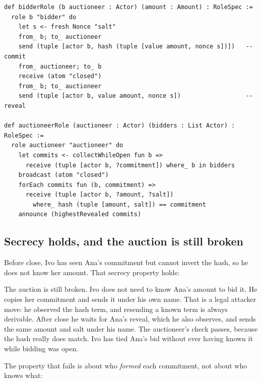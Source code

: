 \begin{lstlisting}
def bidderRole (b auctioneer : Actor) (amount : Amount) : RoleSpec :=
  role b "bidder" do
    let s <- fresh Nonce "salt"
    from_ b; to_ auctioneer
    send (tuple [actor b, hash (tuple [value amount, nonce s])])   -- commit
    from_ auctioneer; to_ b
    receive (atom "closed")
    from_ b; to_ auctioneer
    send (tuple [actor b, value amount, nonce s])                  -- reveal

def auctioneerRole (auctioneer : Actor) (bidders : List Actor) : RoleSpec :=
  role auctioneer "auctioneer" do
    let commits <- collectWhileOpen fun b =>
      receive (tuple [actor b, ?commitment]) where_ b in bidders
    broadcast (atom "closed")
    forEach commits fun (b, commitment) =>
      receive (tuple [actor b, ?amount, ?salt])
        where_ hash (tuple [amount, salt]) == commitment
    announce (highestRevealed commits)
\end{lstlisting}

\subsection{Secrecy holds, and the auction is still broken}

Before close, Ivo has seen Ana's commitment but cannot invert the hash, so he
does not know her amount. That secrecy property holds:


The auction is still broken. Ivo does not need to know Ana's amount to bid it.
He copies her commitment and sends it under his own name. That is a legal
attacker move: he observed the hash term, and resending a known term is always
derivable. After close he waits for Ana's reveal, which he also observes, and
sends the same amount and salt under his name. The auctioneer's check passes,
because the hash really does match. Ivo has tied Ana's bid without ever having
known it while bidding was open.

The property that fails is about who \emph{formed} each commitment, not about
who knows what:


